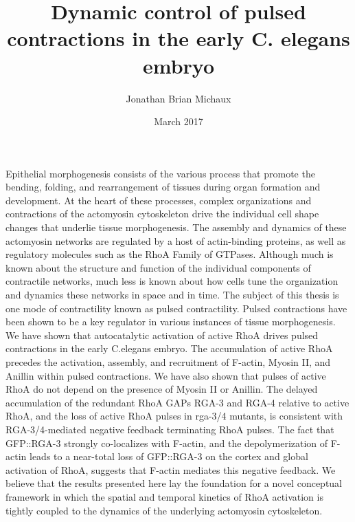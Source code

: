 \documentclass{ucetd}
\title{Dynamic control of pulsed contractions in the early C. elegans embryo}
\author{Jonathan Brian Michaux}
\date{March 2017}
\let\textit\textrm
\begin{document}
\maketitle

\makecopyright
\makededication


\tableofcontents
\listoffigures
\listoftables



\abstract
Epithelial morphogenesis consists of the various process that promote the bending, folding, and rearrangement of tissues during organ formation and development.  At the heart of these processes, complex organizations and contractions of the actomyosin cytoskeleton drive the individual cell shape changes that underlie tissue morphogenesis.  The assembly and dynamics of these actomyosin networks are regulated by a host of actin-binding proteins, as well as regulatory molecules such as the RhoA Family of GTPases.  Although much is known about the structure and function of the individual components of contractile networks, much less is known about how cells tune the organization and dynamics these networks in space and in time.  The subject of this thesis is one mode of contractility known as pulsed contractility.  Pulsed contractions have been shown to be a key regulator in various instances of tissue morphogenesis.  We have shown that autocatalytic activation of active RhoA drives pulsed contractions in the early \textit{C.elegans} embryo.  The accumulation of active RhoA precedes the activation, assembly, and recruitment of F-actin, Myosin II, and Anillin within pulsed contractions.  We have also shown that pulses of active RhoA do not depend on the presence of Myosin II or Anillin.  The delayed accumulation of the redundant RhoA GAPs RGA-3 and RGA-4 relative to active RhoA, and the loss of active RhoA pulses in \textit{rga-3/4} mutants, is consistent with RGA-3/4-mediated negative feedback terminating RhoA pulses.  The fact that GFP::RGA-3 strongly co-localizes with F-actin, and the depolymerization of F-actin leads to a near-total loss of GFP::RGA-3 on the cortex and global activation of RhoA, suggests that F-actin mediates this negative feedback.  We believe that the results presented here lay the foundation for a novel conceptual framework in which the spatial and temporal kinetics of RhoA activation is tightly coupled to the dynamics of the underlying actomyosin cytoskeleton.


\mainmatter






\makebibliography
\end{document}
